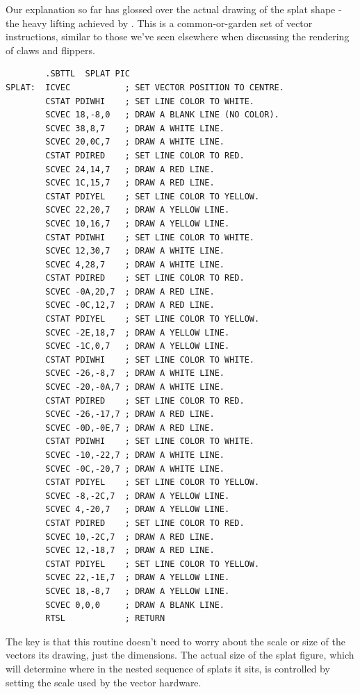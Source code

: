 Our explanation so far has glossed over the actual drawing of the splat shape - the heavy lifting
achieved by . This is a common-or-garden set of vector instructions, similar to
those we've seen elsewhere when discussing the rendering of claws and flippers.
\begin{lstlisting}
        .SBTTL  SPLAT PIC
SPLAT:  ICVEC           ; SET VECTOR POSITION TO CENTRE.
        CSTAT PDIWHI    ; SET LINE COLOR TO WHITE.
        SCVEC 18,-8,0   ; DRAW A BLANK LINE (NO COLOR).
        SCVEC 38,8,7    ; DRAW A WHITE LINE.
        SCVEC 20,0C,7   ; DRAW A WHITE LINE.
        CSTAT PDIRED    ; SET LINE COLOR TO RED.
        SCVEC 24,14,7   ; DRAW A RED LINE.
        SCVEC 1C,15,7   ; DRAW A RED LINE.
        CSTAT PDIYEL    ; SET LINE COLOR TO YELLOW.
        SCVEC 22,20,7   ; DRAW A YELLOW LINE.
        SCVEC 10,16,7   ; DRAW A YELLOW LINE.
        CSTAT PDIWHI    ; SET LINE COLOR TO WHITE.
        SCVEC 12,30,7   ; DRAW A WHITE LINE.
        SCVEC 4,28,7    ; DRAW A WHITE LINE.
        CSTAT PDIRED    ; SET LINE COLOR TO RED.
        SCVEC -0A,2D,7  ; DRAW A RED LINE.
        SCVEC -0C,12,7  ; DRAW A RED LINE.
        CSTAT PDIYEL    ; SET LINE COLOR TO YELLOW.
        SCVEC -2E,18,7  ; DRAW A YELLOW LINE.
        SCVEC -1C,0,7   ; DRAW A YELLOW LINE.
        CSTAT PDIWHI    ; SET LINE COLOR TO WHITE.
        SCVEC -26,-8,7  ; DRAW A WHITE LINE.
        SCVEC -20,-0A,7 ; DRAW A WHITE LINE.
        CSTAT PDIRED    ; SET LINE COLOR TO RED.
        SCVEC -26,-17,7 ; DRAW A RED LINE.
        SCVEC -0D,-0E,7 ; DRAW A RED LINE.
        CSTAT PDIWHI    ; SET LINE COLOR TO WHITE.
        SCVEC -10,-22,7 ; DRAW A WHITE LINE.
        SCVEC -0C,-20,7 ; DRAW A WHITE LINE.
        CSTAT PDIYEL    ; SET LINE COLOR TO YELLOW.
        SCVEC -8,-2C,7  ; DRAW A YELLOW LINE.
        SCVEC 4,-20,7   ; DRAW A YELLOW LINE.
        CSTAT PDIRED    ; SET LINE COLOR TO RED.
        SCVEC 10,-2C,7  ; DRAW A RED LINE.
        SCVEC 12,-18,7  ; DRAW A RED LINE.
        CSTAT PDIYEL    ; SET LINE COLOR TO YELLOW.
        SCVEC 22,-1E,7  ; DRAW A YELLOW LINE.
        SCVEC 18,-8,7   ; DRAW A YELLOW LINE.
        SCVEC 0,0,0     ; DRAW A BLANK LINE.
        RTSL            ; RETURN
\end{lstlisting}
The key is that
this  routine doesn't need to worry about the scale or size of the vectors its drawing, 
just the dimensions. The actual size of the splat figure, which will determine where in the nested
sequence of splats it sits, is controlled by setting the scale used by the vector hardware.

